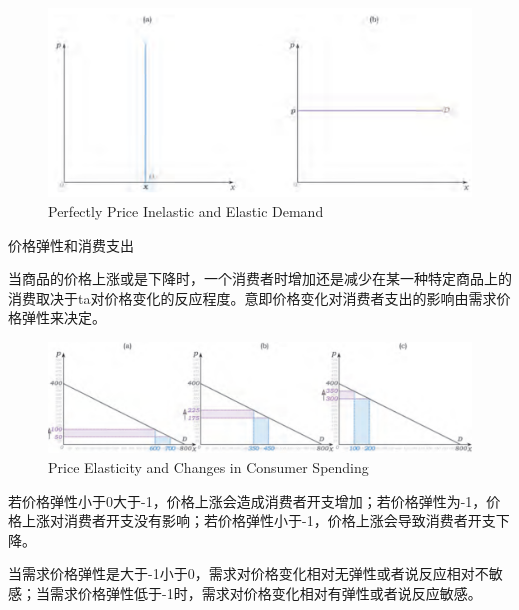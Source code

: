 \documentclass{article}
\begin{document}
\begin{figure}[H] %
	\centering %
	\includegraphics[width=1\textwidth]{18_2} %
	\caption{Perfectly Price Inelastic and Elastic Demand} %
	\label{Fig.main3} %
\end{figure}

\hspace*{\fill}

价格弹性和消费支出

当商品的价格上涨或是下降时，一个消费者时增加还是减少在某一种特定商品上的消费取决于ta对价格变化的反应程度。意即价格变化对消费者支出的影响由需求价格弹性来决定。

\begin{figure}[H] %
	\centering %
	\includegraphics[width=1\textwidth]{18_3} %
	\caption{Price Elasticity and Changes in Consumer Spending} %
	\label{Fig.main4} %
\end{figure}

若价格弹性小于0大于-1，价格上涨会造成消费者开支增加；若价格弹性为-1，价格上涨对消费者开支没有影响；若价格弹性小于-1，价格上涨会导致消费者开支下降。

当需求价格弹性是大于-1小于0，需求对价格变化相对无弹性或者说反应相对不敏感；当需求价格弹性低于-1时，需求对价格变化相对有弹性或者说反应敏感。

\hspace*{\fill}
\end{document}
